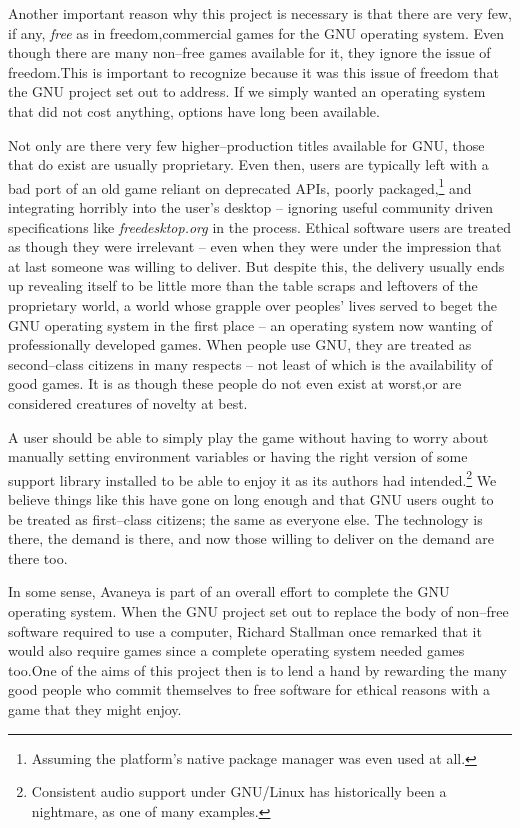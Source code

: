 Another important reason why this project is necessary is that there are very few, if any, {\it free} as in freedom, commercial games for the GNU operating system. Even though there are many non--free games available for it, they ignore the issue of freedom. This is important to recognize because it was this issue of freedom that the GNU project set out to address. If we simply wanted an operating system that did not cost anything, options have long been available.\footnotecite[piratebay]

Not only are there very few higher--production titles available for GNU, those that do exist are usually proprietary. Even then, users are typically left with a bad port of an old game reliant on deprecated APIs, poorly packaged,\footnote{Assuming the platform's native package manager was even used at all.} and integrating horribly into the user's desktop -- ignoring useful community driven specifications like {\it freedesktop.org} in the process. Ethical software users are treated as though they were irrelevant -- even when they were under the impression that at last someone was willing to deliver. But despite this, the delivery usually ends up revealing itself to be little more than the table scraps and leftovers of the proprietary world, a world whose grapple over peoples' lives served to beget the GNU operating system in the first place -- an operating system now wanting of professionally developed games. When people use GNU, they are treated as second--class citizens in many respects -- not least of which is the availability of good games. It is as though these people do not even exist at worst, or are considered creatures of novelty at best. 

A user should be able to simply play the game without having to worry about manually setting environment variables or having the right version of some support library installed to be able to enjoy it as its authors had intended.\footnote{Consistent audio support under GNU/Linux has historically been a nightmare, as one of many examples.} We believe things like this have gone on long enough and that GNU users ought to be treated as first--class citizens; the same as everyone else. The technology is there, the demand is there, and now those willing to deliver on the demand are there too.

In some sense, Avaneya is part of an overall effort to complete the GNU operating system. When the GNU project set out to replace the body of non--free software required to use a computer, Richard Stallman once remarked that it would also require games since a complete operating system needed games too. One of the aims of this project then is to lend a hand by rewarding the many good people who commit themselves to free software for ethical reasons with a game that they might enjoy.


